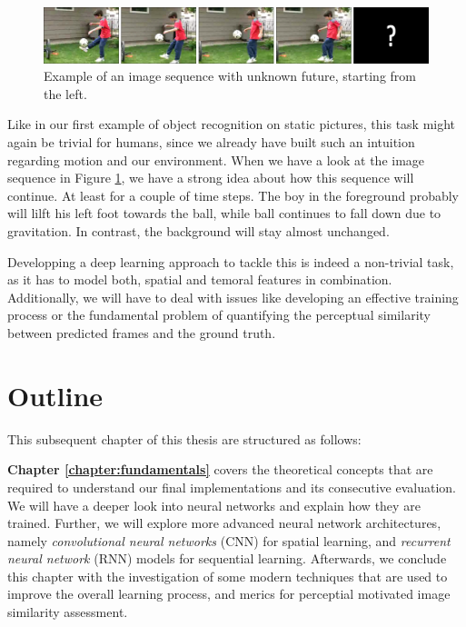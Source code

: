 \begin{figure}[htpb]
	\centering
	\includegraphics[scale=0.25]{figures/ucf-intro/serie1.png} 
	\caption{Example of an image sequence with unknown future, starting from the left.} \label{fig:intro-seq}
\end{figure}

Like in our first example of object recognition on static pictures, this task might again be trivial for humans, since we already have built such an intuition regarding motion and our environment. When we have a look at the image sequence in Figure \ref{fig:intro-seq}, we have a strong idea about how this sequence will continue. At least for a couple of time steps. The boy in the foreground probably will lilft his left foot towards the ball, while ball continues to fall down due to gravitation. In contrast, the background will stay almost unchanged.

Developping a deep learning approach to tackle this is indeed a non-trivial task, as it has to model both, spatial and temoral features in combination. Additionally, we will have to deal with issues like developing an effective training process or the fundamental problem of quantifying the perceptual similarity between predicted frames and the ground truth.


\section{Outline}

This subsequent chapter of this thesis are structured as follows:

\textbf{Chapter \ref{chapter:fundamentals}} covers the theoretical concepts that are required to understand our final implementations and its consecutive evaluation. We will have a deeper look into neural networks and explain how they are trained. Further, we will explore more advanced neural network architectures, namely \textit{convolutional neural networks} (CNN) for spatial learning, and \textit{recurrent neural network} (RNN) models for sequential learning. Afterwards, we conclude this chapter with the investigation of some modern techniques that are used to improve the overall learning process, and merics for perceptial motivated image similarity assessment.

